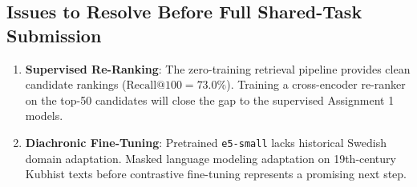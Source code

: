 \subsection{Issues to Resolve Before Full Shared-Task Submission}
\begin{enumerate}
    \item \textbf{Supervised Re-Ranking}: The zero-training retrieval pipeline provides clean candidate rankings ($\text{Recall@100} = 73.0\%$). Training a cross-encoder re-ranker on the top-50 candidates will close the gap to the supervised Assignment 1 models.
    \item \textbf{Diachronic Fine-Tuning}: Pretrained \texttt{e5-small} lacks historical Swedish domain adaptation. Masked language modeling adaptation on 19th-century Kubhist texts before contrastive fine-tuning represents a promising next step.
\end{enumerate}


